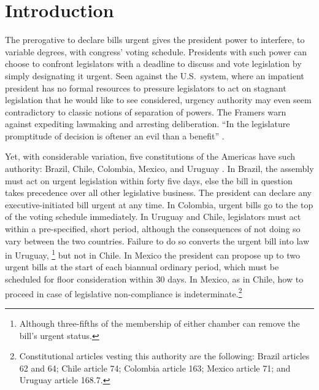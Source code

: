 \documentclass[letter,12pt]{article}
\begin{document}
\onehalfspacing

\section{Introduction}

\noindent The prerogative to declare bills urgent gives the president power to interfere, to variable degrees, with congress' voting schedule. Presidents with such power can choose to confront legislators with a deadline to discuss and vote legislation by simply designating it urgent. Seen against the U.S.\ system, where an impatient president has no formal resources to pressure legislators to act on stagnant legislation that he would like to see considered, urgency authority may even seem contradictory to classic notions of separation of powers. The Framers warn against expediting lawmaking and arresting deliberation. ``In the legislature promptitude of decision is oftener an evil than a benefit'' \citep{hamilton70.1788}.


Yet, with considerable variation, five constitutions of the Americas have such authority: Brazil, Chile, Colombia, Mexico, and Uruguay \citep{morgenstern.2002b}. In Brazil, the assembly must act on urgent legislation within forty five days, else the bill in question takes precedence over all other legislative business. The president can declare any executive-initiated bill urgent at any time. In Colombia, urgent bills go to the top of the voting schedule immediately. In Uruguay and Chile, legislators must act within a pre-specified, short period, although the consequences of not doing so vary between the two countries. Failure to do so converts the urgent bill into law in Uruguay, \footnote{Although three-fifths of the membership of either chamber can remove the bill's urgent status.} but not in Chile. In Mexico the president can propose up to two urgent bills at the start of each biannual ordinary period, which must be scheduled for floor consideration within 30 days. In Mexico, as in Chile, how to proceed in case of legislative non-compliance is indeterminate.\footnote{Constitutional articles vesting this authority are the following: Brazil articles 62 and 64; Chile article 74; Colombia article 163; Mexico article 71; and Uruguay article 168.7.}
\end{document}
